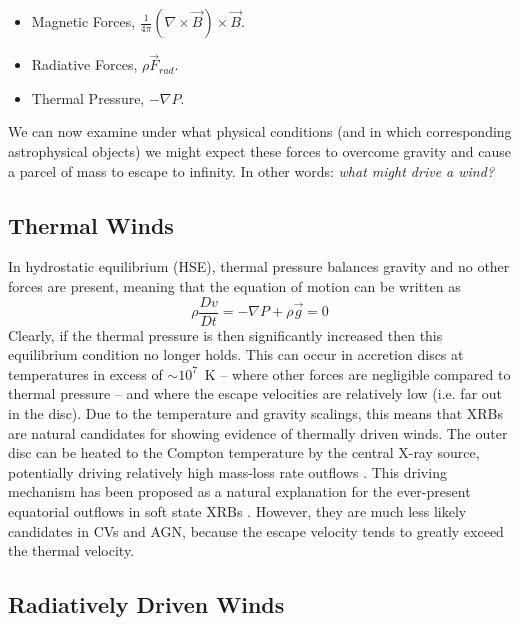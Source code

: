 \begin{itemize}
	\item Magnetic Forces, $\frac{1}{4 \pi}(\nabla \times \vec{B}) \times \vec{B}$.
	\item Radiative Forces, $\rho \vec{F}_{rad}$.
	\item Thermal Pressure, $-\nabla P$.
\end{itemize}

We can now examine under what physical conditions 
(and in which corresponding astrophysical objects)
we might expect these forces to overcome gravity and 
cause a parcel of mass to escape to infinity.
In other words: {\em what might drive a wind?}

\subsection{Thermal Winds}

In hydrostatic equilibrium (HSE), thermal pressure balances gravity and no other forces 
are present, meaning that the equation of motion can be written as 
\begin{equation}
\label{eq:hse}
\rho \frac{Dv}{Dt} = -\nabla P +  \rho \vec{g} = 0
\end{equation}
Clearly, if the thermal pressure is then significantly 
increased then this equilibrium condition no longer holds. 
This can occur in accretion discs at temperatures in excess of $\sim10^7$~K --
where other forces are negligible compared to thermal pressure -- 
and where the escape velocities are relatively low (i.e. far out in the disc).
Due to the temperature and gravity scalings, this means
that XRBs are natural candidates for showing evidence of thermally driven
winds. The outer disc can be heated to the Compton temperature by the central X-ray source,
potentially driving relatively high mass-loss rate outflows \citep{begelman1983,woods1996}. 
This driving mechanism has been proposed as a natural explanation
for the ever-present equatorial outflows in soft state XRBs \citep{ponti2012}.
However, they are much less likely candidates in CVs and AGN, because
the escape velocity tends to greatly exceed the thermal velocity.

\subsection{Radiatively Driven Winds}
\label{sec:rad_winds}

